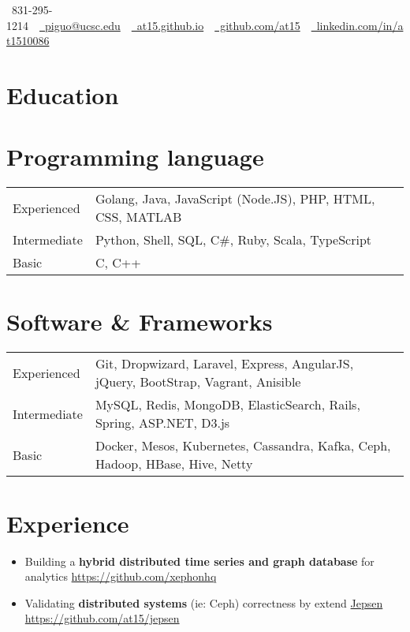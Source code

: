 \documentclass[10pt, letterpaper]{simple-cv}
\begin{document}
\centerline{\faMobile\ 831-295-1214\ \
\href{mailto:piguo@ucsc.edu}{\faEnvelope\ piguo@ucsc.edu}\ \
\href{https://at15.github.io}{\faHome\ at15.github.io}\ \
\href{https://github.com/at15}{\faGithubSquare\ github.com/at15}\ \
\href{https://www.linkedin.com/in/at1510086}{\faLinkedinSquare\ linkedin.com/in/at1510086}}

\section{Education}

\section{Programming language}
\begin{tabular}{ l l }
 Experienced & Golang, Java, JavaScript (Node.JS), PHP, HTML, CSS, MATLAB \\
 Intermediate & Python, Shell, SQL, C\#, Ruby,  Scala, TypeScript \\
 Basic & C, C++
\end{tabular}

\section{Software \& Frameworks}
\begin{tabular}{ l l }
 Experienced & Git, Dropwizard, Laravel, Express, AngularJS, jQuery, BootStrap, Vagrant, Anisible\\
 Intermediate & MySQL, Redis, MongoDB, ElasticSearch, Rails, Spring, ASP.NET, D3.js \\
 Basic & Docker, Mesos, Kubernetes, Cassandra, Kafka, Ceph, Hadoop, HBase, Hive, Netty
\end{tabular}

\section{Experience}
\begin{itemize}
\item Building a \textbf{hybrid distributed time series and graph database} for analytics \url{https://github.com/xephonhq}
\item Validating \textbf{distributed systems} (ie: Ceph) correctness by extend \href{http://jepsen.io/}{Jepsen} \url{https://github.com/at15/jepsen}
\end{itemize}
\end{document}
